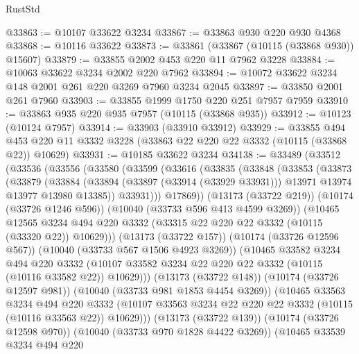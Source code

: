 \begin{lexlean}{RustStd}
\begin{coremodule}
@33863 := @10107 @33622 @3234
@33867 := @33863 @930 @220 @930 @4368
@33868 := @10116 @33622
@33873 := @33861 (@33867 (@10115 (@33868 @930)) @15607)
@33879 := @33855 @2002 @453 @220 @11 @7962 @3228
@33884 := @10063 @33622 @3234 @2002 @220 @7962
@33894 := @10072 @33622 @3234 @148 @2001 @261 @220 @3269 @7960 @3234 @2045
@33897 := @33850 @2001 @261 @7960
@33903 := @33855 @1999 @1750 @220 @251 @7957 @7959
@33910 := @33863 @935 @220 @935 @7957 (@10115 (@33868 @935))
@33912 := @10123 (@10124 @7957)
@33914 := @33903 (@33910 @33912)
@33929 := @33855
    @494
    @453
    @220
    @11
    @3332
    @3228
    (@33863 @22 @220 @22 @3332 (@10115 (@33868 @22)) @10629)
@33931 := @10185 @33622 @3234
@34138 := @33489
    (@33512
      (@33536
        (@33556
          (@33580
            (@33599
              (@33616
                (@33835
                  (@33848
                    (@33853
                      (@33873
                        (@33879
                          (@33884
                            (@33894
                              (@33897 (@33914 (@33929 @33931)))
                              @13971
                              @13974
                              @13977
                              @13980
                              @13385))
                          @33931)))
                    @17869))
                (@13173 (@33722 @219))
                (@10174 (@33726 @1246 @596))
                (@10040 (@33733 @596 @413 @4599 @3269))
                (@10465
                  @12565
                  @3234
                  @494
                  @220
                  @3332
                  (@33315 @22 @220 @22 @3332 (@10115 (@33320 @22)) @10629)))
              (@13173 (@33722 @157))
              (@10174 (@33726 @12596 @567))
              (@10040 (@33733 @567 @1506 @4923 @3269))
              (@10465
                @33582
                @3234
                @494
                @220
                @3332
                (@10107 @33582 @3234 @22 @220 @22 @3332 (@10115 (@10116 @33582 @22)) @10629)))
            (@13173 (@33722 @148))
            (@10174 (@33726 @12597 @981))
            (@10040 (@33733 @981 @1853 @4454 @3269))
            (@10465
              @33563
              @3234
              @494
              @220
              @3332
              (@10107 @33563 @3234 @22 @220 @22 @3332 (@10115 (@10116 @33563 @22)) @10629)))
          (@13173 (@33722 @139))
          (@10174 (@33726 @12598 @970))
          (@10040 (@33733 @970 @1828 @4422 @3269))
          (@10465
            @33539
            @3234
            @494
            @220

\end{coremodule}
\end{lexlean}
